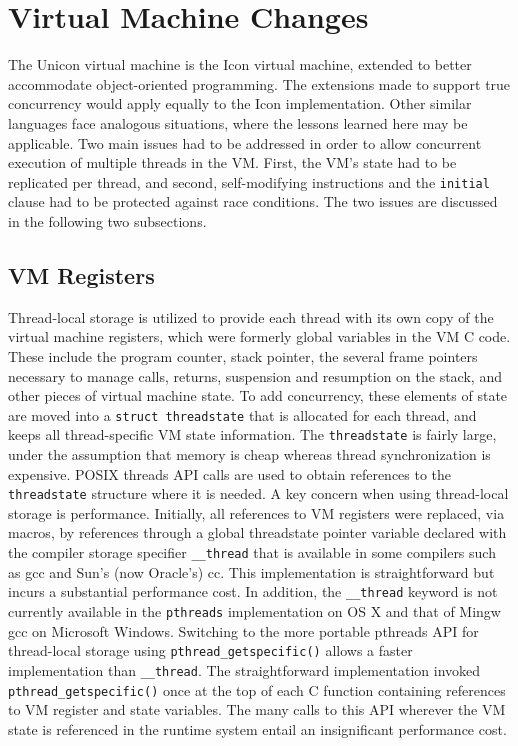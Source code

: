 \section{Virtual Machine Changes}
The Unicon virtual machine is the Icon virtual machine, extended to better
accommodate object-oriented programming. The extensions made to support
true concurrency would apply equally to the Icon implementation. Other
similar languages face analogous situations, where the lessons learned here
may be applicable. Two main issues had to be addressed in order to allow
concurrent execution of multiple threads in the VM. First, the VM's state
had to be replicated per thread, and second, self-modifying instructions
and the \texttt{initial} clause had to be protected against race
conditions. The two issues are discussed in the following two subsections.

\subsection{VM Registers}
Thread-local storage is utilized to provide each thread with its own copy
of the virtual machine registers, which were formerly global variables in
the VM C code. These include the program counter, stack pointer, the
several frame pointers necessary to manage calls, returns, suspension and
resumption on the stack, and other pieces of virtual machine state.  To add
concurrency, these elements of state are moved into a \texttt{struct
  threadstate} that is allocated for each thread, and keeps all
thread-specific VM state information.  The \texttt{threadstate} is fairly
large, under the assumption that memory is cheap whereas thread
synchronization is expensive. POSIX threads API calls are used to obtain
references to the \texttt{threadstate} structure where it is needed.  A key
concern when using thread-local storage is performance. Initially, all
references to VM registers were replaced, via macros, by references through
a global threadstate pointer variable declared with the compiler storage
specifier \texttt{\_\_thread} that is available in some compilers such as
gcc and Sun's (now Oracle's) cc. This implementation is straightforward but
incurs a substantial performance cost. In addition, the \texttt{\_\_thread}
keyword is not currently available in the \texttt{pthreads} implementation
on OS X and that of Mingw gcc on Microsoft Windows.  Switching to the more
portable pthreads API for thread-local storage using
\texttt{pthread\_getspecific()} allows a faster implementation than
\texttt{\_\_thread}. The straightforward implementation invoked
\texttt{pthread\_getspecific()} once at the top of each C function
containing references to VM register and state variables. The many calls to
this API wherever the VM state is referenced in the runtime system entail
an insignificant performance cost.

